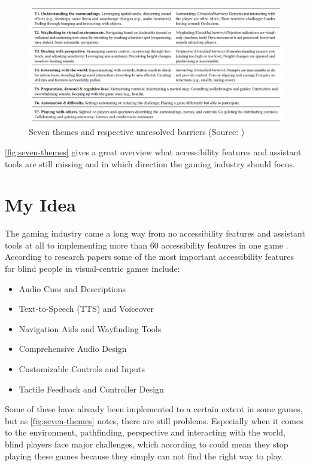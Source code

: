 \documentclass[sigconf,natbib=false,10pt]{acmart}
\begin{document}
	\begin{figure}[ht]
		\centering
		\includegraphics[scale=0.6,width=\textwidth]{assets/seven-themes.png}
		\caption{Seven themes and respective unresolved barriers (Source: \textcite{goncalves_my_2023})}
		\label{fig:seven-themes}
	\end{figure}

	\autoref{fig:seven-themes} gives a great overview what accessibility features and assistant tools are still missing and in which direction the gaming industry should focus.
	
	\section{My Idea}
	The gaming industry came a long way from no accessibility features and assistant tools at all to implementing more than 60 accessibility features in one game \cite{playstation_last_2020}.
	According to research papers \cite{goncalves_my_2023, grammenos_designing_2009, grammenos_game_2008, araujo_mobile_2017} some of the most important accessibility features for blind people in visual-centric games include:
	
	\begin{itemize}
		\item Audio Cues and Descriptions
		\item Text-to-Speech (TTS) and Voiceover
		\item Navigation Aids and Wayfinding Tools
		\item Comprehensive Audio Design
		\item Customizable Controls and Inputs
		\item Tactile Feedback and Controller Design
	\end{itemize}
    
    Some of these have already been implemented to a certain extent in some games, but as \autoref{fig:seven-themes} notes, there are still problems.
    Especially when it comes to the environment, pathfinding, perspective and interacting with the world, blind players face major challenges, which according to \textcite{goncalves_my_2023} could mean they stop playing these games because they simply can not find the right way to play.
    
\end{document}

